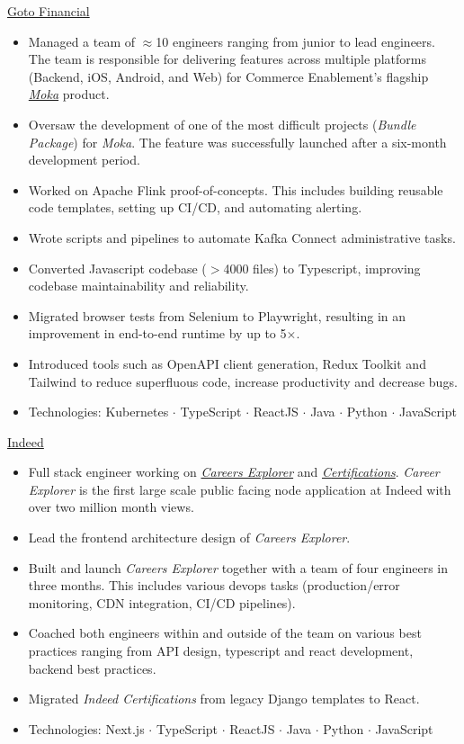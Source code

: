 \documentclass[]{cv} %
\begin{document}
\entry
{\href{https://gotofinancial.com/en}{Goto Financial}}
{
\begin{itemize}
\item Managed a team of $\approx$10 engineers ranging from junior to lead engineers. The team is responsible for delivering features across multiple platforms (Backend, iOS, Android, and Web) for Commerce Enablement's flagship \href{https://www.mokapos.com/en}{\emph{Moka}} product.
\item Oversaw the development of one of the most difficult projects (\emph{Bundle Package}) for \emph{Moka}. The feature was successfully launched after a six-month development period.
\item Worked on Apache Flink proof-of-concepts. This includes building reusable code templates, setting up CI/CD, and automating alerting.
\item Wrote scripts and pipelines to automate Kafka Connect administrative tasks.
\item Converted Javascript codebase ($> $4000 files) to Typescript, improving codebase maintainability and reliability.
\item Migrated browser tests from Selenium to Playwright, resulting in an improvement in end-to-end runtime by up to 5$\times$.
\item Introduced tools such as OpenAPI client generation, Redux Toolkit and Tailwind to reduce superfluous code, increase productivity and decrease bugs.
\item Technologies: Kubernetes $\cdot$ TypeScript $\cdot$ ReactJS $\cdot$ Java $\cdot$ Python $\cdot$ JavaScript
\end{itemize}
}

\entry
{\href{https://www.indeed.com/}{Indeed}}
{
\begin{itemize}
\item Full stack engineer working on \href{https://www.indeed.com/career}{\emph{Careers Explorer}} and \href{https://www.indeed.com/certifications/}{\emph{Certifications}}. \emph{Career Explorer} is the first large scale public facing node application at Indeed with over two million month views.
\item Lead the frontend architecture design of \emph{Careers Explorer}.
\item Built and launch \emph{Careers Explorer} together with a team of four engineers in three months. This includes various devops tasks (production/error monitoring, CDN integration, CI/CD pipelines).
\item Coached both engineers within and outside of the team on various best practices ranging from API design, typescript and react development, backend best practices.
\item Migrated \emph{Indeed Certifications} from legacy Django templates to React.
\item Technologies: Next.js $\cdot$ TypeScript $\cdot$ ReactJS $\cdot$ Java $\cdot$ Python $\cdot$ JavaScript
\end{itemize}
}
\end{document}
